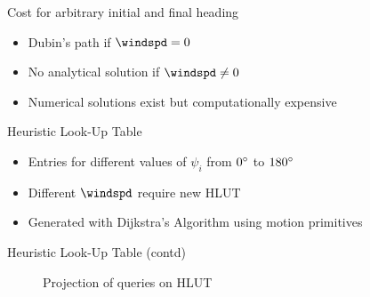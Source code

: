\documentclass{beamer}
\begin{document}
\begin{frame}{Cost for arbitrary initial and final heading}
    \begin{itemize}
        \item Dubin's path if $\windspd=0$
        \item No analytical solution if $\windspd\neq0$
        \item Numerical solutions exist but computationally expensive
    \end{itemize}
\end{frame}

\begin{frame}{Heuristic Look-Up Table}
    \begin{itemize}
        \item Entries for different values of $\psi_i$ from $0\degree$ to $180\degree$
        \item Different $\windspd$ require new HLUT
        \item Generated with Dijkstra's Algorithm using motion primitives
    \end{itemize}
\end{frame}

\begin{frame}{Heuristic Look-Up Table (contd)}
    \begin{figure}
        \begin{center}
        \end{center}
        \caption{Projection of queries on HLUT}
        \label{fig:hlut_proj}
    \end{figure}
\end{frame}
\end{document}
